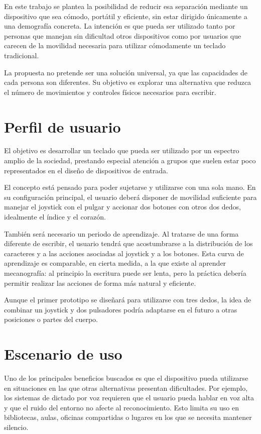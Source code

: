 En este trabajo se plantea la posibilidad de reducir esa separación mediante un dispositivo que sea cómodo, portátil y eficiente, sin estar dirigido únicamente a una demografía concreta. La intención es que pueda ser utilizado tanto por personas que manejan sin dificultad otros dispositivos como por usuarios que carecen de la movilidad necesaria para utilizar cómodamente un teclado tradicional.

La propuesta no pretende ser una solución universal, ya que las capacidades de cada persona son diferentes. Su objetivo es explorar una alternativa que reduzca el número de movimientos y controles físicos necesarios para escribir.

\section{Perfil de usuario}
\label{sec:perfil-usuario}

El objetivo es desarrollar un teclado que pueda ser utilizado por un espectro amplio de la sociedad, prestando especial atención a grupos que suelen estar poco representados en el diseño de dispositivos de entrada.

El concepto está pensado para poder sujetarse y utilizarse con una sola mano. En su configuración principal, el usuario deberá disponer de movilidad suficiente para manejar el joystick con el pulgar y accionar dos botones con otros dos dedos, idealmente el índice y el corazón.

También será necesario un periodo de aprendizaje. Al tratarse de una forma diferente de escribir, el usuario tendrá que acostumbrarse a la distribución de los caracteres y a las acciones asociadas al joystick y a los botones. Esta curva de aprendizaje es comparable, en cierta medida, a la que existe al aprender mecanografía: al principio la escritura puede ser lenta, pero la práctica debería permitir realizar las acciones de forma más natural y eficiente.

Aunque el primer prototipo se diseñará para utilizarse con tres dedos, la idea de combinar un joystick y dos pulsadores podría adaptarse en el futuro a otras posiciones o partes del cuerpo.

\section{Escenario de uso}
\label{sec:escenario-uso}

Uno de los principales beneficios buscados es que el dispositivo pueda utilizarse en situaciones en las que otras alternativas presentan dificultades. Por ejemplo, los sistemas de dictado por voz requieren que el usuario pueda hablar en voz alta y que el ruido del entorno no afecte al reconocimiento. Esto limita su uso en bibliotecas, aulas, oficinas compartidas o lugares en los que se necesita mantener silencio.

